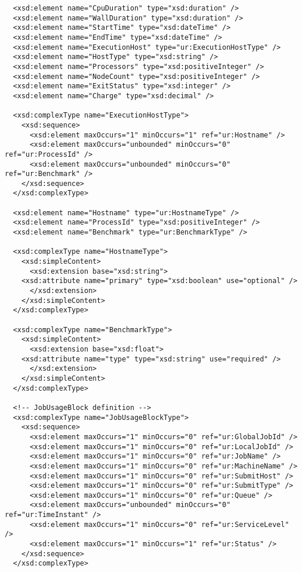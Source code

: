 \begin{verbatim}
  <xsd:element name="CpuDuration" type="xsd:duration" />
  <xsd:element name="WallDuration" type="xsd:duration" />
  <xsd:element name="StartTime" type="xsd:dateTime" />
  <xsd:element name="EndTime" type="xsd:dateTime" />
  <xsd:element name="ExecutionHost" type="ur:ExecutionHostType" />
  <xsd:element name="HostType" type="xsd:string" />
  <xsd:element name="Processors" type="xsd:positiveInteger" />
  <xsd:element name="NodeCount" type="xsd:positiveInteger" />
  <xsd:element name="ExitStatus" type="xsd:integer" />
  <xsd:element name="Charge" type="xsd:decimal" />

  <xsd:complexType name="ExecutionHostType">
    <xsd:sequence>
      <xsd:element maxOccurs="1" minOccurs="1" ref="ur:Hostname" />
      <xsd:element maxOccurs="unbounded" minOccurs="0" ref="ur:ProcessId" />
      <xsd:element maxOccurs="unbounded" minOccurs="0" ref="ur:Benchmark" />
    </xsd:sequence>
  </xsd:complexType>

  <xsd:element name="Hostname" type="ur:HostnameType" />
  <xsd:element name="ProcessId" type="xsd:positiveInteger" />
  <xsd:element name="Benchmark" type="ur:BenchmarkType" />

  <xsd:complexType name="HostnameType">
    <xsd:simpleContent>
      <xsd:extension base="xsd:string">
	<xsd:attribute name="primary" type="xsd:boolean" use="optional" />
      </xsd:extension>
    </xsd:simpleContent>
  </xsd:complexType>

  <xsd:complexType name="BenchmarkType">
    <xsd:simpleContent>
      <xsd:extension base="xsd:float">
	<xsd:attribute name="type" type="xsd:string" use="required" />
      </xsd:extension>
    </xsd:simpleContent>
  </xsd:complexType>

  <!-- JobUsageBlock definition -->
  <xsd:complexType name="JobUsageBlockType">
    <xsd:sequence>
      <xsd:element maxOccurs="1" minOccurs="0" ref="ur:GlobalJobId" />
      <xsd:element maxOccurs="1" minOccurs="0" ref="ur:LocalJobId" />
      <xsd:element maxOccurs="1" minOccurs="0" ref="ur:JobName" />
      <xsd:element maxOccurs="1" minOccurs="0" ref="ur:MachineName" />
      <xsd:element maxOccurs="1" minOccurs="0" ref="ur:SubmitHost" />
      <xsd:element maxOccurs="1" minOccurs="0" ref="ur:SubmitType" />
      <xsd:element maxOccurs="1" minOccurs="0" ref="ur:Queue" />
      <xsd:element maxOccurs="unbounded" minOccurs="0" ref="ur:TimeInstant" />
      <xsd:element maxOccurs="1" minOccurs="0" ref="ur:ServiceLevel" />
      <xsd:element maxOccurs="1" minOccurs="1" ref="ur:Status" />
    </xsd:sequence>
  </xsd:complexType>


\end{verbatim}
